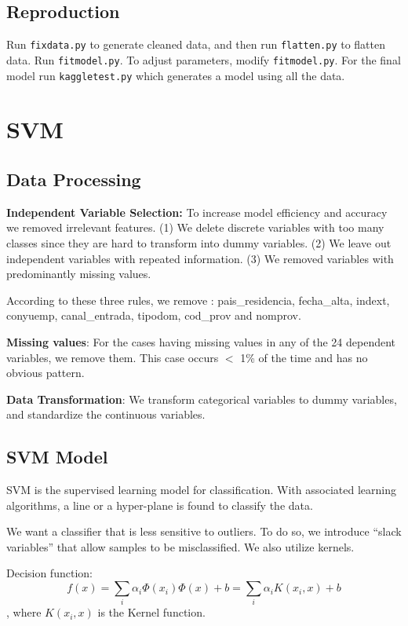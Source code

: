 \documentclass{article}
\begin{document}
\begin{spacing}{1}
\begin{large}
\subsection{Reproduction}
Run \texttt{fixdata.py} to generate cleaned data, and then run \texttt{flatten.py} to flatten data. Run \texttt{fitmodel.py}. To adjust parameters, modify \texttt{fitmodel.py}. For the final model run \texttt{kaggletest.py} which generates a model using all the data.

\section{SVM}

\subsection{Data Processing}
\textbf{Independent Variable Selection:} To increase model efficiency and accuracy we removed irrelevant features. (1) We delete discrete variables with too many classes since they are hard to transform into dummy variables. (2) We leave out independent variables with repeated information. (3) We removed variables with predominantly missing values.

According to these three  rules, we remove : pais\_residencia, fecha\_alta, indext, conyuemp, canal\_entrada, tipodom, cod\_prov and nomprov.

\textbf{Missing values}: For the cases having missing values in any of the 24 dependent variables, we remove them. This case occurs $<$ 1\% of the time and has no obvious pattern.

\textbf{Data Transformation}: We transform categorical variables to dummy variables, and standardize the continuous variables.

\subsection{SVM Model}

SVM is the supervised learning model for classification. With associated learning algorithms, a line or a hyper-plane is found to classify the data. \cite{book}

We want a classifier that is less sensitive to outliers. To do so, we introduce “slack variables” that allow samples to be misclassified. We also utilize kernels.

Decision function:
$$f(x) = \displaystyle\sum_{i}\alpha_i\Phi(x_i)\Phi(x)+b = \displaystyle\sum_{i}\alpha_{i} K(x_i, x)+b$$, where $K(x_i, x)$ is the Kernel function.


\end{large}
\end{spacing}
\end{document}
